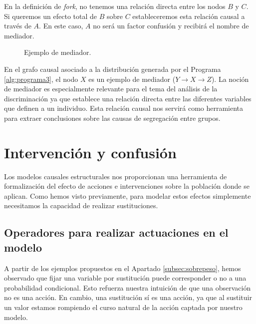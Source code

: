 \documentclass[oneside,openright,titlepage,numbers=noenddot,openany,headinclude,footinclude=true,
cleardoublepage=empty,abstractoff,BCOR=5mm,paper=a4,fontsize=12pt,main=spanish]{scrreprt}
\begin{document}
En la definición de \textit{fork}, no tenemos una relación directa entre los nodos $B$ y $C$. Si queremos un efecto total de $B$ sobre $C$ estableceremos esta relación causal a través de $A$. En este caso, $A$ no será un factor confusión y recibirá el nombre de mediador.\\

\begin{figure}[h]
\centering
{}
\caption{Ejemplo de mediador.}
\label{fig:mediator}
\end{figure}

En el grafo causal asociado a la distribución generada por el Programa \ref{alg:programa3}, el nodo $X$ es un ejemplo de mediador ($Y \to X \to Z$). La noción de mediador es especialmente relevante para el tema del análisis de la discriminación ya que establece una relación directa entre las diferentes variables que definen a un individuo. Esta relación causal nos servirá como herramienta para extraer conclusiones sobre las causas de segregación entre grupos.

\section{Intervención y confusión}

Los modelos causales estructurales nos proporcionan una herramienta de formalización del efecto de acciones e intervenciones sobre la población donde se aplican. Como hemos visto previamente, para modelar estos efectos simplemente necesitamos la capacidad de realizar sustituciones.

\subsection{Operadores para realizar actuaciones en el modelo}

A partir de los ejemplos propuestos en el Apartado \ref{subsec:sobrepeso}, hemos observado que fijar una variable por sustitución puede corresponder o no a una probabilidad condicional. Esto refuerza nuestra intuición de que una observación no es una acción. En cambio, una sustitución sí es una acción, ya que al sustituir un valor estamos rompiendo el curso natural de la acción captada por nuestro modelo.\\
\end{document}
